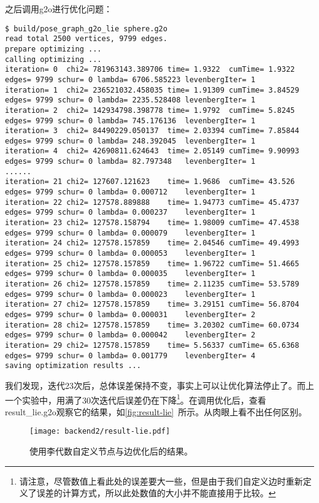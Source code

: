 之后调用g2o进行优化问题：

\begin{lstlisting}
$ build/pose_graph_g2o_lie sphere.g2o    
read total 2500 vertices, 9799 edges.
prepare optimizing ...
calling optimizing ...
iteration= 0  chi2= 781963143.389706 time= 1.9322  cumTime= 1.9322  edges= 9799 schur= 0 lambda= 6706.585223 levenbergIter= 1
iteration= 1  chi2= 236521032.458035 time= 1.91309 cumTime= 3.84529 edges= 9799 schur= 0 lambda= 2235.528408 levenbergIter= 1
iteration= 2  chi2= 142934798.398778 time= 1.9792  cumTime= 5.8245  edges= 9799 schur= 0 lambda= 745.176136  levenbergIter= 1
iteration= 3  chi2= 84490229.050137  time= 2.03394 cumTime= 7.85844 edges= 9799 schur= 0 lambda= 248.392045  levenbergIter= 1
iteration= 4  chi2= 42690811.624643  time= 2.05149 cumTime= 9.90993 edges= 9799 schur= 0 lambda= 82.797348   levenbergIter= 1
......
iteration= 21 chi2= 127607.121623    time= 1.9686  cumTime= 43.526  edges= 9799 schur= 0 lambda= 0.000712    levenbergIter= 1
iteration= 22 chi2= 127578.889888    time= 1.94773 cumTime= 45.4737 edges= 9799 schur= 0 lambda= 0.000237    levenbergIter= 1
iteration= 23 chi2= 127578.158794    time= 1.98009 cumTime= 47.4538 edges= 9799 schur= 0 lambda= 0.000079    levenbergIter= 1
iteration= 24 chi2= 127578.157859    time= 2.04546 cumTime= 49.4993 edges= 9799 schur= 0 lambda= 0.000053    levenbergIter= 1
iteration= 25 chi2= 127578.157859    time= 1.96722 cumTime= 51.4665 edges= 9799 schur= 0 lambda= 0.000035    levenbergIter= 1
iteration= 26 chi2= 127578.157859    time= 2.11235 cumTime= 53.5789 edges= 9799 schur= 0 lambda= 0.000023    levenbergIter= 1
iteration= 27 chi2= 127578.157859    time= 3.29151 cumTime= 56.8704 edges= 9799 schur= 0 lambda= 0.000031    levenbergIter= 2
iteration= 28 chi2= 127578.157859    time= 3.20302 cumTime= 60.0734 edges= 9799 schur= 0 lambda= 0.000042    levenbergIter= 2
iteration= 29 chi2= 127578.157859    time= 5.56337 cumTime= 65.6368 edges= 9799 schur= 0 lambda= 0.001779    levenbergIter= 4
saving optimization results ...
\end{lstlisting}

我们发现，迭代23次后，总体误差保持不变，事实上可以让优化算法停止了。而上一个实验中，用满了30次迭代后误差仍在下降\footnote{请注意，尽管数值上看此处的误差要大一些，但是由于我们自定义边时重新定义了误差的计算方式，所以此处数值的大小并不能直接用于比较。}。在调用优化后，查看result\_lie.g2o观察它的结果，如\autoref{fig:result-lie}~所示。从肉眼上看不出任何区别。

\begin{figure}[!ht]
	\centering
	\texttt{[image: backend2/result-lie.pdf]}
	\caption{使用李代数自定义节点与边优化后的结果。}
	\label{fig:result-lie}
\end{figure}


